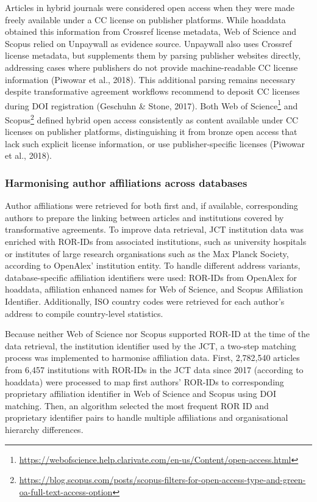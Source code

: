 \documentclass[a4paper,man,floatsintext,longtable,noextraspace,10pt]{apa6}
\begin{document}
Articles in hybrid journals were considered open access when they were
made freely available under a CC license on publisher platforms. While
hoaddata obtained this information from Crossref license metadata, Web
of Science and Scopus relied on Unpaywall as evidence source. Unpaywall
also uses Crossref license metadata, but supplements them by parsing
publisher websites directly, addressing cases where publishers do not
provide machine-readable CC license information (Piwowar et al., 2018).
This additional parsing remains necessary despite transformative
agreement workflows recommend to deposit CC licenses during DOI
registration (Geschuhn \& Stone, 2017). Both Web of Science\footnote{\url{https://webofscience.help.clarivate.com/en-us/Content/open-access.html}}
and Scopus\footnote{\url{https://blog.scopus.com/posts/scopus-filters-for-open-access-type-and-green-oa-full-text-access-option}}
defined hybrid open access consistently as content available under CC
licenses on publisher platforms, distinguishing it from bronze open
access that lack such explicit license information, or use
publisher-specific licenses (Piwowar et al., 2018).

\subsubsection{Harmonising author affiliations across
databases}\label{harmonising-author-affiliations-across-databases}

Author affiliations were retrieved for both first and, if available,
corresponding authors to prepare the linking between articles and
institutions covered by transformative agreements. To improve data
retrieval, JCT institution data was enriched with ROR-IDs from
associated institutions, such as university hospitals or institutes of
large research organisations such as the Max Planck Society, according
to OpenAlex' institution entity. To handle different address variants,
database-specific affiliation identifiers were used: ROR-IDs from
OpenAlex for hoaddata, affiliation enhanced names for Web of Science,
and Scopus Affiliation Identifier. Additionally, ISO country codes were
retrieved for each author's address to compile country-level statistics.

Because neither Web of Science nor Scopus supported ROR-ID at the time
of the data retrieval, the institution identifier used by the JCT, a
two-step matching process was implemented to harmonise affiliation data.
First, 2,782,540 articles from 6,457 institutions with ROR-IDs in the
JCT data since 2017 (according to hoaddata) were processed to map first
authors' ROR-IDs to corresponding proprietary affiliation identifier in
Web of Science and Scopus using DOI matching. Then, an algorithm
selected the most frequent ROR ID and proprietary identifier pairs to
handle multiple affiliations and organisational hierarchy differences.
\end{document}
